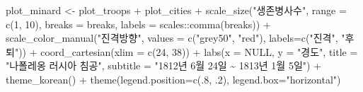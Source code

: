 \documentclass[
  letterpaper,
  chapter,a4paper,showtrims,openright,hidelinks]{oblivoir}
\newenvironment{Shaded}{\begin{snugshade}}{\end{snugshade}}
\newcommand{\AttributeTok}[1]{\textcolor[rgb]{0.40,0.45,0.13}{#1}}
\newcommand{\ConstantTok}[1]{\textcolor[rgb]{0.56,0.35,0.01}{#1}}
\newcommand{\DecValTok}[1]{\textcolor[rgb]{0.68,0.00,0.00}{#1}}
\newcommand{\FunctionTok}[1]{\textcolor[rgb]{0.28,0.35,0.67}{#1}}
\newcommand{\NormalTok}[1]{\textcolor[rgb]{0.00,0.23,0.31}{#1}}
\newcommand{\OtherTok}[1]{\textcolor[rgb]{0.00,0.23,0.31}{#1}}
\newcommand{\SpecialCharTok}[1]{\textcolor[rgb]{0.37,0.37,0.37}{#1}}
\newcommand{\StringTok}[1]{\textcolor[rgb]{0.13,0.47,0.30}{#1}}
\begin{document}
\begin{Shaded}
\begin{Highlighting}[]
\NormalTok{plot\_minard }\OtherTok{\textless{}{-}}\NormalTok{ plot\_troops }\SpecialCharTok{+}\NormalTok{ plot\_cities }\SpecialCharTok{+}
    \FunctionTok{scale\_size}\NormalTok{(}\StringTok{"생존병사수"}\NormalTok{, }\AttributeTok{range =} \FunctionTok{c}\NormalTok{(}\DecValTok{1}\NormalTok{, }\DecValTok{10}\NormalTok{), }
                \AttributeTok{breaks =}\NormalTok{ breaks, }\AttributeTok{labels =}\NormalTok{ scales}\SpecialCharTok{::}\FunctionTok{comma}\NormalTok{(breaks)) }\SpecialCharTok{+}
  \FunctionTok{scale\_color\_manual}\NormalTok{(}\StringTok{"진격방향"}\NormalTok{, }
                     \AttributeTok{values =} \FunctionTok{c}\NormalTok{(}\StringTok{"grey50"}\NormalTok{, }\StringTok{"red"}\NormalTok{), }
                     \AttributeTok{labels=}\FunctionTok{c}\NormalTok{(}\StringTok{"진격"}\NormalTok{, }\StringTok{"후퇴"}\NormalTok{)) }\SpecialCharTok{+}
  \FunctionTok{coord\_cartesian}\NormalTok{(}\AttributeTok{xlim =} \FunctionTok{c}\NormalTok{(}\DecValTok{24}\NormalTok{, }\DecValTok{38}\NormalTok{)) }\SpecialCharTok{+}
  \FunctionTok{labs}\NormalTok{(}\AttributeTok{x =} \ConstantTok{NULL}\NormalTok{,}
       \AttributeTok{y =} \StringTok{"경도"}\NormalTok{,}
       \AttributeTok{title =} \StringTok{"나폴레옹 러시아 침공"}\NormalTok{,}
       \AttributeTok{subtitle =} \StringTok{"1812년 6월 24일 \textasciitilde{} 1813년 1월 5일"}\NormalTok{) }\SpecialCharTok{+}
  \FunctionTok{theme\_korean}\NormalTok{() }\SpecialCharTok{+}
  \FunctionTok{theme}\NormalTok{(}\AttributeTok{legend.position=}\FunctionTok{c}\NormalTok{(.}\DecValTok{8}\NormalTok{, .}\DecValTok{2}\NormalTok{), }\AttributeTok{legend.box=}\StringTok{"horizontal"}\NormalTok{)}
 

\end{Highlighting}
\end{Shaded}
\end{document}
